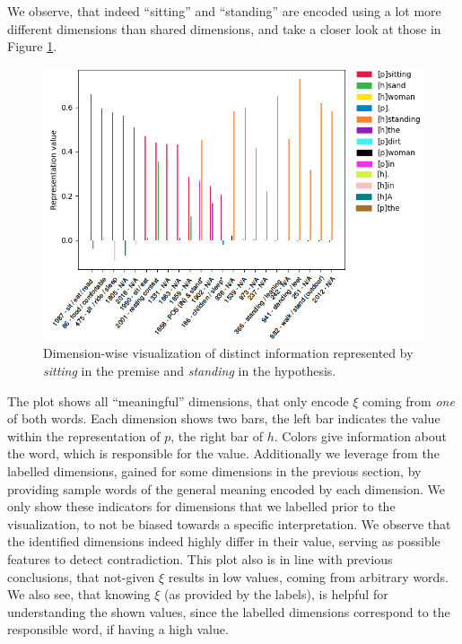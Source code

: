 We observe, that indeed ``sitting'' and ``standing'' are encoded using a lot more different dimensions than shared dimensions, and take a closer look at those in Figure \ref{fig:contradiction_alignment_unshared_dimwise}. 
\begin{figure}[tph!]
\centering
	\includegraphics[totalheight=7cm]{fig/contradiction_alignment_unshared_dimwise.png}
	\caption{Dimension-wise visualization of distinct information represented by \textit{sitting} in the premise and \textit{standing} in the hypothesis.}
	\label{fig:contradiction_alignment_unshared_dimwise}
\end{figure}
The plot shows all ``meaningful'' dimensions, that only encode $\xi$ coming from \textit{one} of both words. Each dimension shows two bars, the left bar indicates the value within the representation of $p$, the right bar of $h$. Colors give information about the word, which is responsible for the value. Additionally we leverage from the labelled dimensions, gained for some dimensions in the previous section, by providing sample words of the general meaning encoded by each dimension. We only show these indicators for dimensions that we labelled prior to the visualization, to not be biased towards a specific interpretation. We observe that the identified dimensions indeed highly differ in their value, serving as possible features to detect contradiction. This plot also is in line with previous conclusions, that not-given $\xi$ results in low values, coming from arbitrary words. We also see, that knowing $\xi$ (as provided by the labels), is helpful for understanding the shown values, since the labelled dimensions correspond to the responsible word, if having a high value.
